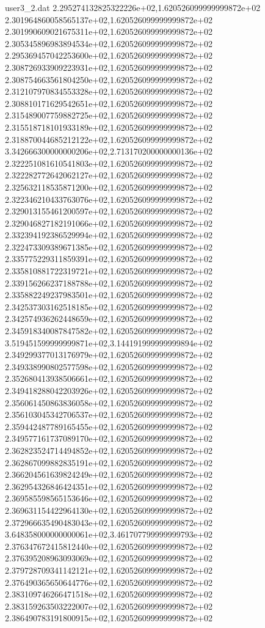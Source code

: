 \begin{filecontents}{user3_2.dat}
2.295274132825322226e+02,1.620526099999999872e+02
2.301964860058565137e+02,1.620526099999999872e+02
2.301990609021675311e+02,1.620526099999999872e+02
2.305345896983894534e+02,1.620526099999999872e+02
2.295369457042253600e+02,1.620526099999999872e+02
2.308726933909223931e+02,1.620526099999999872e+02
2.308754663561804250e+02,1.620526099999999872e+02
2.312107970834553328e+02,1.620526099999999872e+02
2.308810171629542651e+02,1.620526099999999872e+02
2.315489007759882725e+02,1.620526099999999872e+02
2.315518718101933189e+02,1.620526099999999872e+02
2.318870044685212122e+02,1.620526099999999872e+02
3.342666300000000206e+02,2.713170200000000136e+02
2.322251081610541803e+02,1.620526099999999872e+02
2.322282772642062127e+02,1.620526099999999872e+02
2.325632118535871200e+02,1.620526099999999872e+02
2.322346210433763076e+02,1.620526099999999872e+02
2.329013155461200597e+02,1.620526099999999872e+02
2.329046827182191066e+02,1.620526099999999872e+02
2.332394192386529994e+02,1.620526099999999872e+02
2.322473309389671385e+02,1.620526099999999872e+02
2.335775229311859391e+02,1.620526099999999872e+02
2.335810881722319721e+02,1.620526099999999872e+02
2.339156266237188788e+02,1.620526099999999872e+02
2.335882249237983501e+02,1.620526099999999872e+02
2.342537303162518185e+02,1.620526099999999872e+02
2.342574936262448659e+02,1.620526099999999872e+02
2.345918340087847582e+02,1.620526099999999872e+02
3.519451599999999871e+02,3.144191999999999894e+02
2.349299377013176979e+02,1.620526099999999872e+02
2.349338990802577598e+02,1.620526099999999872e+02
2.352680413938506661e+02,1.620526099999999872e+02
2.349418288042203926e+02,1.620526099999999872e+02
2.356061450863836058e+02,1.620526099999999872e+02
2.356103045342706537e+02,1.620526099999999872e+02
2.359442487789165455e+02,1.620526099999999872e+02
2.349577161737089170e+02,1.620526099999999872e+02
2.362823524714494852e+02,1.620526099999999872e+02
2.362867099882835191e+02,1.620526099999999872e+02
2.366204561639824249e+02,1.620526099999999872e+02
2.362954326846424351e+02,1.620526099999999872e+02
2.369585598565153646e+02,1.620526099999999872e+02
2.369631154422964130e+02,1.620526099999999872e+02
2.372966635490483043e+02,1.620526099999999872e+02
3.648358000000000061e+02,3.461707799999999793e+02
2.376347672415812440e+02,1.620526099999999872e+02
2.376395208963093069e+02,1.620526099999999872e+02
2.379728709341142121e+02,1.620526099999999872e+02
2.376490365650644776e+02,1.620526099999999872e+02
2.383109746266471518e+02,1.620526099999999872e+02
2.383159263503222007e+02,1.620526099999999872e+02
2.386490783191800915e+02,1.620526099999999872e+02

\end{filecontents}
